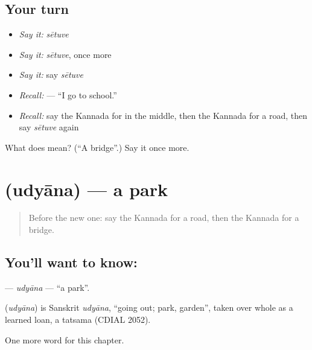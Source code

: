 \subsection*{Your turn}
\begin{itemize}
\raggedright
  \item \emph{Say it:} \emph{sētuve}
  \item \emph{Say it:} \emph{sētuve}, once more
  \item \emph{Say it:} say \emph{sētuve}
  \item \emph{Recall:} \textbf{  } — “I go to school.”
  \item \emph{Recall:} say the Kannada for in the middle, then the Kannada for a road, then say \emph{sētuve} again
\end{itemize}

\begin{tcolorbox}[breakable,colback=teal!4,colframe=teal!35!black,title={Before you move on}]
What does  mean? (\textquotedblleft{}A bridge\textquotedblright{}.) Say it once more.
\end{tcolorbox}
\section[\texorpdfstring{\kn{ಉದ್ಯಾನ} (udyāna)}{ಉದ್ಯಾನ (udyāna)}]{ (udyāna) — a park}

\label{lesson:KA-C109-udyana}



\begin{quote}
Before the new one: say the Kannada for a road, then the Kannada for a bridge.
\end{quote}

\subsection*{You'll want to know: }
\textbf{} — \emph{udyāna} — \textquotedblleft{}a park\textquotedblright{}.

\begin{cousinweb}
\textbf{} (\emph{udyāna}) is Sanskrit \emph{udyāna}, \textquotedblleft{}going out; park, garden\textquotedblright{}, taken over whole as a learned loan, a tatsama (CDIAL 2052).
\end{cousinweb}

\begin{grammarlens}[title={What you've built}]
One more word for this chapter.
\end{grammarlens}

